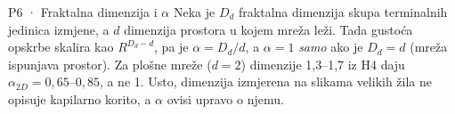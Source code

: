 \begin{propozicija}{P6 · Fraktalna dimenzija i $\alpha$}
Neka je $D_d$ fraktalna dimenzija skupa terminalnih jedinica izmjene, a $d$ dimenzija prostora u kojem mreža leži. Tada gustoća opskrbe skalira kao $R^{D_d-d}$, pa je $\alpha=D_d/d$, a $\alpha=1$ \emph{samo} ako je $D_d=d$ (mreža ispunjava prostor). Za plošne mreže ($d=2$) dimenzije 1,3–1,7 iz H4 daju $\alpha_{2D}=0{,}65$–$0{,}85$, a ne 1. Usto, dimenzija izmjerena na slikama velikih žila ne opisuje kapilarno korito, a $\alpha$ ovisi upravo o njemu.
\end{propozicija}
